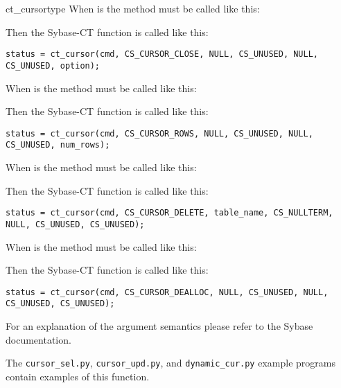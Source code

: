 \begin{methoddesc}[CS_COMMAND]{ct_cursor}{type \optional{, \ldots}}
When  is  the method must be called like
this:


Then the Sybase-CT  function is called like
this:

\begin{verbatim}
status = ct_cursor(cmd, CS_CURSOR_CLOSE, NULL, CS_UNUSED, NULL, CS_UNUSED, option);
\end{verbatim}

When  is  the method must be called like
this:


Then the Sybase-CT  function is called like
this:

\begin{verbatim}
status = ct_cursor(cmd, CS_CURSOR_ROWS, NULL, CS_UNUSED, NULL, CS_UNUSED, num_rows);
\end{verbatim}

When  is  the method must be called like
this:


Then the Sybase-CT  function is called like
this:

\begin{verbatim}
status = ct_cursor(cmd, CS_CURSOR_DELETE, table_name, CS_NULLTERM, NULL, CS_UNUSED, CS_UNUSED);
\end{verbatim}

When  is  the method must be called like
this:


Then the Sybase-CT  function is called like
this:

\begin{verbatim}
status = ct_cursor(cmd, CS_CURSOR_DEALLOC, NULL, CS_UNUSED, NULL, CS_UNUSED, CS_UNUSED);
\end{verbatim}

For an explanation of the argument semantics please refer to the
Sybase documentation.

The \texttt{cursor_sel.py}, \texttt{cursor_upd.py}, and
\texttt{dynamic_cur.py} example programs contain examples of this
function.
\end{methoddesc}

